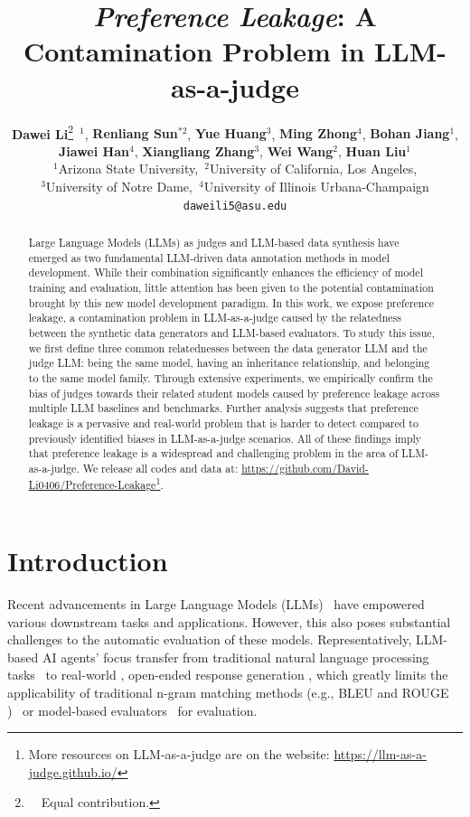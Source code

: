\documentclass{article} %
\title{\textit{Preference Leakage}: A Contamination Problem in LLM-as-a-judge}
\author{\textbf{Dawei Li}\thanks{\ \ Equal contribution.}~$^{1}$,
\textbf{Renliang Sun$^{*2}$},
\textbf{Yue Huang$^{3}$},
\textbf{Ming Zhong$^{4}$},
\textbf{Bohan Jiang$^{1}$}, \\
\textbf{Jiawei Han$^{4}$},
\textbf{Xiangliang Zhang$^{3}$},
\textbf{Wei Wang$^{2}$},
\textbf{Huan Liu$^{1}$} \\
$^{1}$Arizona State University,\ $^{2}$University of California, Los Angeles, \\
$^{3}$University of Notre Dame,\ $^{4}$University of Illinois Urbana-Champaign \\
\texttt{daweili5@asu.edu}
}
\begin{document}
\maketitle


\begin{abstract}
  Large Language Models (LLMs) as judges and LLM-based data synthesis have emerged as two fundamental LLM-driven data annotation methods in model development. While their combination significantly enhances the efficiency of model training and evaluation, little attention has been given to the potential contamination brought by this new model development paradigm. In this work, we expose preference leakage, a contamination problem in LLM-as-a-judge caused by the relatedness between the synthetic data generators and LLM-based evaluators. To study this issue, we first define three common relatednesses between the data generator LLM and the judge LLM: being the same model, having an inheritance relationship, and belonging to the same model family. Through extensive experiments, we empirically confirm the bias of judges towards their related student models caused by preference leakage across multiple LLM baselines and benchmarks. Further analysis suggests that preference leakage is a pervasive and real-world problem that is harder to detect compared to previously identified biases in LLM-as-a-judge scenarios. All of these findings imply that preference leakage is a widespread and challenging problem in the area of LLM-as-a-judge.
  We release all codes and data at: \url{https://github.com/David-Li0406/Preference-Leakage}\footnote{More resources on LLM-as-a-judge are on the website: \url{https://llm-as-a-judge.github.io/}}.
\end{abstract}


\section{Introduction}
Recent advancements in Large Language Models (LLMs)~\cite{achiam2023gpt,jaech2024openai,tong2024can,zhang2024shifcon,tan2024interpreting,tan2025probing,huang2026rethinking} have empowered various downstream tasks and applications. However, this also poses substantial challenges to the automatic evaluation of these models. Representatively, LLM-based AI agents' focus transfer from traditional natural language processing tasks~\cite{yang2023new,zhang2023assisting} to real-world \cite{liu2023agentbench, huang2023metatool}, open-ended response generation \cite{wu2024unigen}, which greatly limits the applicability of traditional n-gram matching methods (e.g., BLEU \cite{papineni2002bleu} and ROUGE \cite{lin2004rouge})~\cite{liu2016not,reiter2018structured} or model-based evaluators~\cite{zhangbertscore, unieval} for evaluation. 
\end{document}
